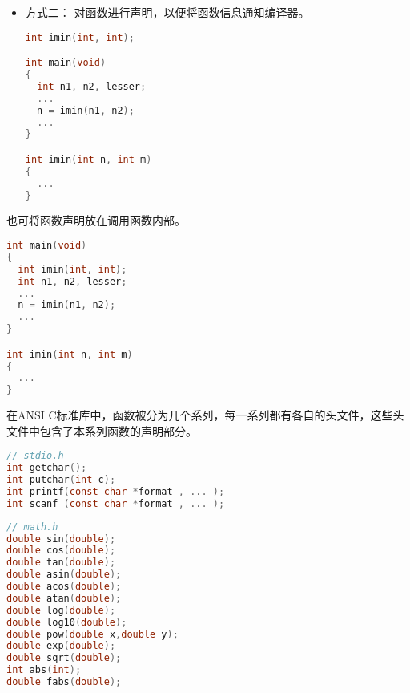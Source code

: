 \begin{frame}[fragile]
\begin{itemize}
\item 方式二：
对函数进行声明，以便将函数信息通知编译器。\\[0.1in]
\begin{lstlisting}[language=c,backgroundcolor=\color{red!10}]
int imin(int, int);

int main(void)
{
  int n1, n2, lesser;
  ...
  n = imin(n1, n2);
  ...
}

int imin(int n, int m)
{
  ... 
}
\end{lstlisting}
\end{itemize}
\end{frame}

\begin{frame}[fragile]
也可将函数声明放在调用函数内部。 
\begin{lstlisting}[language=c,backgroundcolor=\color{red!10}]
int main(void)
{
  int imin(int, int);
  int n1, n2, lesser;
  ...
  n = imin(n1, n2);
  ...
}

int imin(int n, int m)
{
  ... 
}
\end{lstlisting}
\end{frame}

\begin{frame}[fragile]
在ANSI C标准库中，函数被分为几个系列，每一系列都有各自的头文件，这些头文件中包含了本系列函数的声明部分。
\end{frame}

\begin{frame}[fragile]
  \begin{lstlisting}[language=c,backgroundcolor=\color{red!10}]
// stdio.h 
int getchar();
int putchar(int c);
int printf(const char *format , ... );
int scanf (const char *format , ... );
\end{lstlisting}
\end{frame}

\begin{frame}[fragile]
  \begin{lstlisting}[language=c,backgroundcolor=\color{red!10}]
// math.h
double sin(double);   
double cos(double);   
double tan(double);   
double asin(double);  
double acos(double); 
double atan(double); 
double log(double);  
double log10(double); 
double pow(double x,double y); 
double exp(double); 
double sqrt(double); 
int abs(int);  
double fabs(double); 
\end{lstlisting}
\end{frame}
